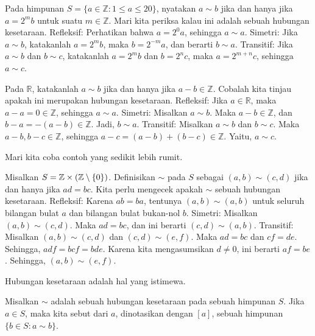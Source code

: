 \begin{exmp}
\label{exmp1.13}
Pada himpunan $S = \{a \in \mathbb{Z} : 1 \leq a \leq 20\}$, nyatakan $a \sim b$ jika dan hanya jika $a = 2^m b$ untuk suatu $m \in \mathbb{Z}$. Mari kita periksa kalau ini adalah sebuah hubungan kesetaraan. Refleksif: Perhatikan bahwa $a = 2^0 a$, sehingga $a \sim a$. Simetri: Jika $a \sim b$, katakanlah $a = 2^m b$, maka $b = 2^{-m}a$, dan berarti $b \sim a$. Transitif: Jika $a \sim b$ dan $b \sim c$, katakanlah $a = 2^m b$ dan $ b = 2^n c$, maka $a = 2^{m+n} c$, sehingga $a \sim c$.
\end{exmp}

\begin{exmp}
\label{exmp1.14}
Pada $\mathbb{R}$, katakanlah $a \sim b$ jika dan hanya jika $a -b \in \mathbb{Z}$. Cobalah kita tinjau apakah ini merupakan hubungan kesetaraan. Refleksif:  Jika $a \in \mathbb{R}$, maka $a - a = 0 \in \mathbb{Z}$, sehingga $a \sim a$. Simetri: Misalkan $a \sim b$. Maka $ a - b \in \mathbb{Z}$, dan $b-a = -(a-b) \in \mathbb{Z}$. Jadi, $b \sim a$. Transitif: Misalkan $a \sim b$ dan $b \sim c$. Maka $a - b, b - c \in \mathbb{Z}$, sehingga $a - c = (a-b) + (b-c) \in \mathbb{Z}$. Yaitu, $a \sim c$.
\end{exmp}

Mari kita coba contoh yang sedikit lebih rumit.

\begin{exmp}
\label{exmp1.15}
Misalkan $S = \mathbb{Z} \times (\mathbb{Z} \setminus \{0\})$. Definisikan $\sim$ pada $S$ sebagai $(a,b) \sim (c,d)$ jika dan hanya jika $ad = bc$. Kita perlu mengecek apakah $\sim$ sebuah hubungan kesetaraan. Refleksif: Karena $ab = ba$, tentunya $(a,b) \sim (a,b)$ untuk seluruh bilangan bulat $a$ dan bilangan bulat bukan-nol $b$. Simetri: Misalkan $(a,b) \sim (c,d)$. Maka $ad = bc$, dan ini berarti $(c,d) \sim (a,b)$. Transitif: Misalkan $(a,b) \sim (c,d)$ dan $(c,d) \sim (e,f)$. Maka $ad = bc$ dan $cf = de$. Sehingga, $adf = bcf = bde$. Karena kita mengasumsikan $d \neq 0$, ini berarti $af = be$. Sehingga, $(a, b) \sim (e, f)$.
\end{exmp}

Hubungan kesetaraan adalah hal yang istimewa.

\begin{defn}
Misalkan $\sim$ adalah sebuah hubungan kesetaraan pada sebuah himpunan $S$. Jika $a \in S$, maka kita sebut  dari $a$, dinotasikan dengan $[a]$, sebuah himpunan $\{b \in S: a \sim b\}$.
\end{defn}

